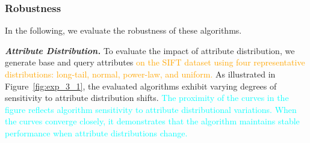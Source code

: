 \documentclass[sigconf, nonacm]{acmart}
\begin{document}
{	
	
	
	
	
	
	
	
	\subsubsection{Robustness}In the following, we evaluate the robustness of these algorithms.
	
	\textit{\textbf{Attribute Distribution.}} To evaluate the impact of attribute distribution, we generate base and query attributes \textcolor{orange}{on the SIFT dataset using four representative distributions: long-tail, normal, power-law, and uniform.}
	As illustrated in Figure~\ref{fig:exp_3_1}, the evaluated algorithms exhibit varying degrees of sensitivity to attribute distribution shifts. \textcolor{cyan}{The proximity of the curves in the figure reflects algorithm sensitivity to attribute distributional variations. When the curves converge closely, it demonstrates that the algorithm maintains stable performance when attribute distributions change.} 

}
\end{document}
